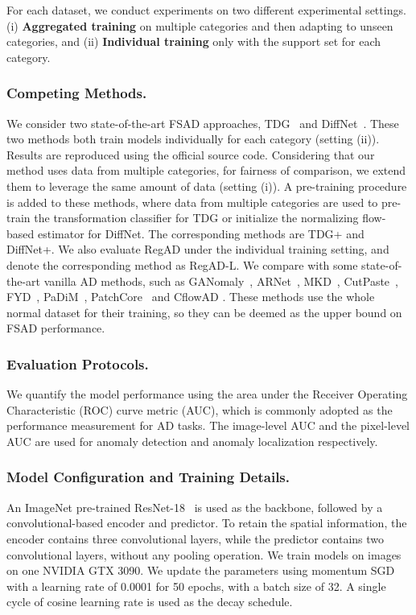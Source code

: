 \documentclass[runningheads]{llncs}
\begin{document}
For each dataset, we conduct experiments on two different experimental settings. (i) \textbf{Aggregated training} on multiple categories and then adapting to unseen categories, and (ii) \textbf{Individual training} only with the support set for each category.

\subsubsection{Competing Methods.} 
We consider two state-of-the-art FSAD approaches, TDG~\cite{TDG} and DiffNet~\cite{DiffNet}. These two methods both train models individually for each category (setting (ii)). Results are reproduced using the official source code. Considering that our method uses data from multiple categories, for fairness of comparison, we extend them to leverage the same amount of data (setting (i)). A pre-training procedure is added to these methods, where data from multiple categories are used to pre-train the transformation classifier for TDG or initialize the normalizing flow-based estimator for DiffNet. The corresponding methods are TDG+ and DiffNet+. We also evaluate RegAD under the individual training setting, and denote the corresponding method as RegAD-L. We compare with some state-of-the-art vanilla AD methods, such as GANomaly~\cite{ganomaly}, ARNet~\cite{ARNet}, MKD~\cite{MKD}, CutPaste~\cite{cutpaste}, FYD~\cite{focus}, PaDiM~\cite{defard2021padim}, PatchCore~\cite{patchcore} and CflowAD \cite{cflow}. These methods use the whole normal dataset for their training, so they can be deemed as the upper bound on FSAD performance.

\subsubsection{Evaluation Protocols.} 
We quantify the model performance using the area under the Receiver Operating Characteristic (ROC) curve metric (AUC), which is commonly adopted as the performance measurement for AD tasks. The image-level AUC and the pixel-level AUC are used for anomaly detection and anomaly localization respectively.

\subsubsection{Model Configuration and Training Details.}
An ImageNet pre-trained ResNet-18~\cite{he2016deep} is used as the backbone, followed by a convolutional-based encoder and predictor. To retain the spatial information, the encoder contains three  convolutional layers, while the predictor contains two  convolutional layers, without any pooling operation. We train models on  images on one NVIDIA GTX 3090. We update the parameters using momentum SGD with a learning rate of 0.0001 for 50 epochs, with a batch size of 32. A single cycle of cosine learning rate is used as the decay schedule. 
\end{document}
